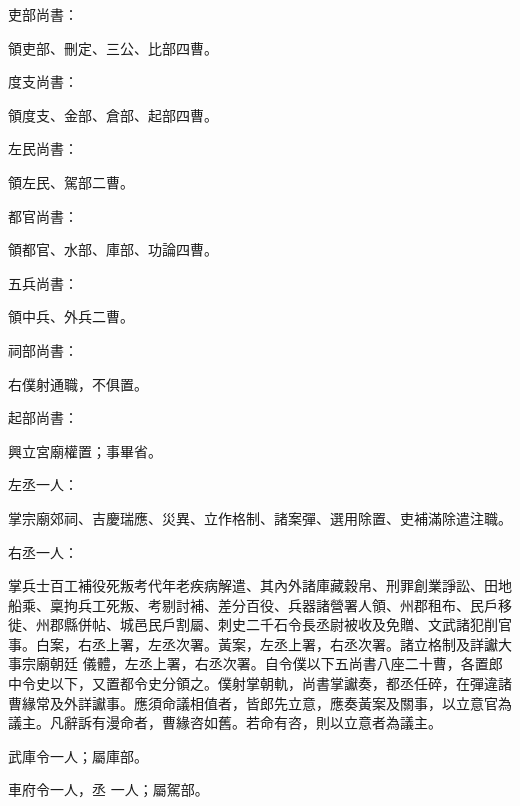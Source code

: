 \begin{pinyinscope}
 吏部尚書：



 領吏部、刪定、三公、比部四曹。



 度支尚書：



 領度支、金部、倉部、起部四曹。



 左民尚書：



 領左民、駕部二曹。



 都官尚書：



 領都官、水部、庫部、功論四曹。



 五兵尚書：



 領中兵、外兵二曹。



 祠部尚書：



 右僕射通職，不俱置。



 起部尚書：



 興立宮廟權置；事畢省。



 左丞一人：



 掌宗廟郊祠、吉慶瑞應、災異、立作格制、諸案彈、選用除置、吏補滿除遣注職。



 右丞一人：



 掌兵士百工補役死叛考代年老疾病解遣、其內外諸庫藏穀帛、刑罪創業諍訟、田地船乘、稟拘兵工死叛、考剔討補、差分百役、兵器諸營署人領、州郡租布、民戶移徙、州郡縣併帖、城邑民戶割屬、刺史二千石令長丞尉被收及免贈、文武諸犯削官事。白案，右丞上署，左丞次署。黃案，左丞上署，右丞次署。諸立格制及詳讞大事宗廟朝廷
 儀體，左丞上署，右丞次署。自令僕以下五尚書八座二十曹，各置郎中令史以下，又置都令史分領之。僕射掌朝軌，尚書掌讞奏，都丞任碎，在彈違諸曹緣常及外詳讞事。應須命議相值者，皆郎先立意，應奏黃案及關事，以立意官為議主。凡辭訴有漫命者，曹緣咨如舊。若命有咨，則以立意者為議主。



 武庫令一人；屬庫部。



 車府令一人，丞
 一人；屬駕部。




\end{pinyinscope}
